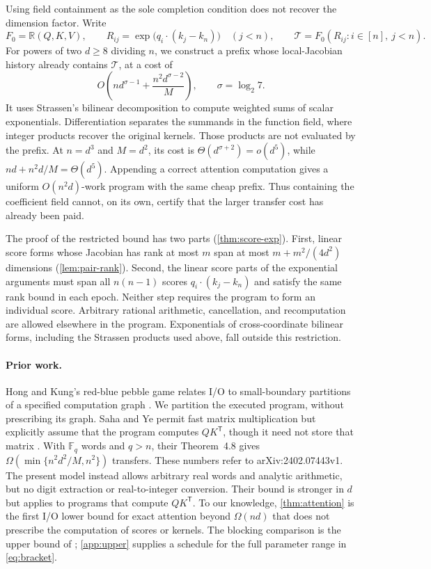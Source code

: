 \documentclass[11pt]{article}
\theoremstyle{definition}
\theoremstyle{remark}
\newcommand{\R}{\mathbb R}
\newcommand{\cT}{\mathcal T}
\begin{document}
Using field containment as the sole completion condition does not
recover the dimension factor. Write
\begin{equation}
 F_0=\R(Q,K,V),\qquad
 R_{ij}=\exp\bigl(q_i\cdot(k_j-k_n)\bigr)\quad(j<n),\qquad
 \cT=F_0(R_{ij}:i\in[n],\ j<n).
 \label{eq:target}
\end{equation}
For powers of two $d\ge8$ dividing $n$, we construct a prefix whose
local-Jacobian history already contains $\cT$, at a cost of
\begin{equation}
 O\!\left(nd^{\sigma-1}+\frac{n^2d^{\sigma-2}}{M}\right),
 \qquad \sigma=\log_2 7.
 \label{eq:prefix-intro}
\end{equation}
It uses Strassen's bilinear decomposition to compute weighted sums of
scalar exponentials. Differentiation separates the summands in the
function field, where integer products recover the original kernels.
Those products are not evaluated by the prefix. At $n=d^3$ and
$M=d^2$, its cost is $\Theta(d^{\sigma+2})=o(d^5)$, while
$nd+n^2d/M=\Theta(d^5)$. Appending a correct attention computation
gives a uniform $O(n^2d)$-work program with the same cheap prefix.
Thus containing the coefficient field cannot, on its own, certify
that the larger transfer cost has already been paid.

The proof of the restricted bound has two parts
(\cref{thm:score-exp}). First, linear score forms whose Jacobian has
rank at most $m$ span at most $m+m^2/(4d^2)$ dimensions
(\cref{lem:pair-rank}). Second, the linear score parts of the exponential
arguments must span all $n(n-1)$ scores $q_i\cdot(k_j-k_n)$ and satisfy
the same rank bound in each epoch. Neither step requires the program to form an individual score.
Arbitrary rational arithmetic, cancellation, and recomputation are
allowed elsewhere in the program.
Exponentials of cross-coordinate bilinear forms,
including the Strassen products used above, fall outside this restriction.

\paragraph{Prior work.}
Hong and Kung's red-blue pebble game relates I/O to small-boundary
partitions of a specified computation graph
\cite[Theorem~3.1]{hongkung1981}. We partition the executed program,
without prescribing its graph. Saha and Ye permit fast matrix
multiplication but explicitly assume that the program computes
$QK^{\mathsf T}$, though it need not store that matrix
\cite[Section~4]{sahaye2024}. With $\mathbb F_q$ words and $q>n$, their
Theorem~4.8 gives $\Omega(\min\{n^2d^2/M,n^2\})$ transfers. These
numbers refer to arXiv:2402.07443v1. The present model instead allows
arbitrary real words and analytic arithmetic, but no digit extraction
or real-to-integer conversion. Their bound is stronger in $d$ but
applies to programs that compute $QK^{\mathsf T}$. To our knowledge,
\cref{thm:attention} is the first I/O lower bound for exact attention
beyond $\Omega(nd)$ that does not prescribe the computation of scores or
kernels.
The blocking comparison is the upper
bound of \cite[Theorem~2]{dao2022}; \cref{app:upper} supplies a schedule
for the full parameter range in \cref{eq:bracket}.
\end{document}
